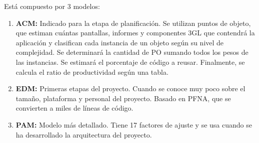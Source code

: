 \documentclass{article}
\begin{document}
\begin{itemize}
	Está compuesto por 3 modelos:
	\begin{enumerate}
		\item \textbf{ACM:} Indicado para la etapa de planificación. Se utilizan puntos de objeto, que estiman cuántas pantallas, informes y componentes 3GL que contendrá la aplicación y clasifican cada instancia de un objeto según su nivel de complejidad. Se determinará la cantidad de PO sumando todos los pesos de las instancias. Se estimará el porcentaje de código a reusar. Finalmente, se calcula el ratio de productividad según una tabla. 
		\item \textbf{EDM:} Primeras etapas del proyecto. Cuando se conoce muy poco sobre el tamaño, plataforma y personal del proyecto. Basado en PFNA, que se convierten a miles de líneas de código.
		\item \textbf{PAM:} Modelo más detallado. Tiene 17 factores de ajuste y se usa cuando se ha desarrollado la arquitectura del proyecto. 
	\end{enumerate}
\end{itemize}





\newpage





\end{document}
